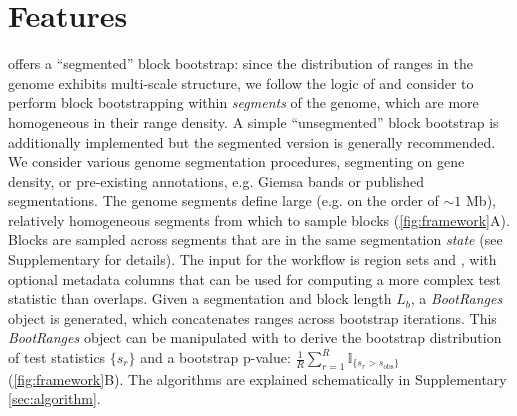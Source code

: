 \section{Features}

\bootranges offers a ``segmented'' block bootstrap:
since the distribution of ranges in the genome exhibits multi-scale
structure, we follow the logic of \citet{bickel2010subsampling} and consider to
perform block bootstrapping within \textit{segments} of the genome, which are
more homogeneous in their range density.
A simple ``unsegmented'' block bootstrap is additionally
  implemented but the segmented version is generally recommended.  We
  consider various genome segmentation procedures, segmenting on gene
  density, or pre-existing annotations, e.g. Giemsa bands or
published segmentations.
The genome segments define large (e.g. on the order of ${\sim}1$ Mb),
relatively homogeneous segments from which to sample blocks
(\cref{fig:framework}A).
Blocks are sampled across segments that are in the same
  segmentation \textit{state} (see Supplementary for details).
The input for the workflow is region sets  and
, with optional metadata columns that can be
used for computing a more complex test statistic than overlaps.
Given a segmentation and block length $L_b$, a \textit{BootRanges}
object is generated, which concatenates ranges across bootstrap
iterations. This \textit{BootRanges} object can be manipulated with \plyranges
to derive the bootstrap distribution of test statistics $\{s_r\}$ and a
bootstrap p-value:
$ \frac{1}{R} \sum_{r=1}^R \mathbb{I}_{\{s_r > s_\text{obs}\}} $ (\cref{fig:framework}B).
The \bootranges algorithms are explained schematically in Supplementary \cref{sec:algorithm}.


